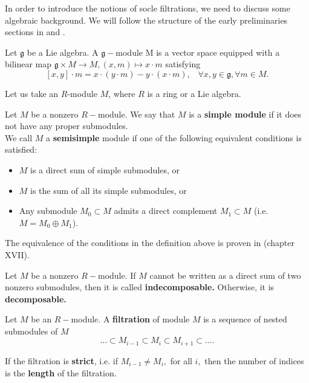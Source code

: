 \documentclass[main.tex]{subfiles}
\begin{document}
In order to introduce the notions of socle filtrations, we need to discuss some algebraic background. We will follow the structure of the early preliminaries sections in \cite{zokirovathesis} and \cite{weissthesis}.\\

\begin{defn}
Let $\mathfrak{g}$ be a Lie algebra. A $\mathfrak{g}-$module M is a vector space equipped with a bilinear map $\mathfrak{g}\times M\to M, (x,m)\mapsto x\cdot m$ satisfying 
$$[x,y]\cdot m = x\cdot (y\cdot m) - y\cdot (x\cdot m), \;\;\; \forall x,y\in\mathfrak{g}, \forall m\in M.$$    
\end{defn}

\bigskip

Let us take an $R$-module $M$, where $R$ is a ring or a Lie algebra. 

\begin{defn}
    Let $M$ be a nonzero $R-$module. We say that $M$ is a \textbf{simple module} if it does not have any proper submodules. \\
    
    We call $M$ a \textbf{semisimple} module if one of the following equivalent conditions is satisfied:
    \begin{itemize}
        \item $M$ is a direct sum of simple submodules, or
        \item $M$ is the sum of all its simple submodules, or
        \item Any submodule $M_0\subset M$ admits a direct complement $M_1\subset M$ (i.e. $M = M_0\oplus M_1$).
    \end{itemize}
\end{defn}

\bigskip

The equivalence of the conditions in the definition above is proven in \cite{lang2012algebra} (chapter XVII).\\


\begin{defn}
    Let $M$ be a nonzero $R-$module. If $M$ cannot be written as a direct sum of two nonzero submodules, then it is called \textbf{indecomposable.} Otherwise, it is \textbf{decomposable.}
\end{defn}

\bigskip

\begin{defn}
Let $M$ be an $R-$module. A \textbf{ filtration} of module $M$ is a sequence of nested submodules of $M$
$$...\subset M_{i-1} \subset M_i \subset M_{i+1}\subset ... .$$

If the filtration is \textbf{strict}, i.e. if $M_{i-1}\neq M_i,$ for all $i,$ then the number of indices is the \textbf{length} of the filtration.
\end{defn}
\end{document}
